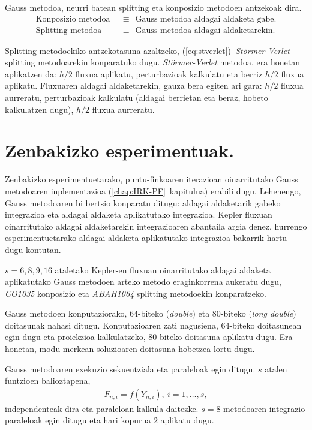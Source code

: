 Gauss metodoa, neurri batean  splitting eta konposizio metodoen antzekoak dira. 
\begin{align*}
\text{Konposizio metodoa} \ \ &\equiv \ \ \text{Gauss metodoa aldagai aldaketa gabe}.\\
\text{Splitting metodoa} \ \ &\equiv \ \  \text{Gauss metodoa aldagai aldaketarekin}.
\end{align*}

Splitting metodoekiko antzekotasuna azaltzeko, (\ref{eq:stverlet})~\emph{Störmer-Verlet} splitting metodoarekin konparatuko dugu. \emph{Störmer-Verlet} metodoa, era honetan aplikatzen da: $h/2$ fluxua aplikatu, perturbazioak kalkulatu eta berriz  $h/2$ fluxua aplikatu. Fluxuaren aldagai aldaketarekin, gauza bera egiten ari gara: $h/2$ fluxua aurreratu, perturbazioak kalkulatu (aldagai berrietan eta beraz, hobeto kalkulatzen dugu), $h/2$ fluxua aurreratu. 


\section{Zenbakizko esperimentuak.}
\label{s:7espmt}

Zenbakizko esperimentuetarako, puntu-finkoaren iterazioan oinarritutako Gauss metodoaren inplementazioa (\ref{chap:IRK-PF}~kapitulua) erabili dugu. Lehenengo, Gauss metodoaren bi bertsio konparatu ditugu: aldagai aldaketarik gabeko integrazioa eta aldagai aldaketa aplikatutako integrazioa. Kepler fluxuan oinarritutako aldagai aldaketarekin integrazioaren abantaila argia denez, hurrengo esperimentuetarako aldagai aldaketa aplikatutako integrazioa bakarrik hartu dugu kontutan.  
 
$s=6,8,9,16$ ataletako Kepler-en fluxuan oinarritutako aldagai aldaketa aplikatutako Gauss metodoen arteko metodo eraginkorrena aukeratu dugu, \emph{CO1035} konposizio eta \emph{ABAH1064} splitting  metodoekin konparatzeko.

Gauss metodoen konputaziorako, $64$-biteko (\emph{double}) eta $80$-biteko (\emph{long double}) doitasunak nahasi ditugu. Konputazioaren zati nagusiena, $64$-biteko doitasunean egin dugu eta proiekzioa kalkulatzeko, $80$-biteko doitasuna aplikatu dugu. Era honetan, modu merkean soluzioaren doitasuna hobetzea lortu dugu.

Gauss metodoaren exekuzio sekuentziala eta paraleloak egin ditugu. $s$ atalen funtzioen balioztapena, 
\begin{align*}
F_{n,i}=f(Y_{n,i}), \ i=1,\dots,s,
\end{align*}      
independenteak dira eta paraleloan kalkula daitezke. $s=8$ metodoaren integrazio paraleloak egin ditugu eta hari kopurua $2$ aplikatu dugu. 

